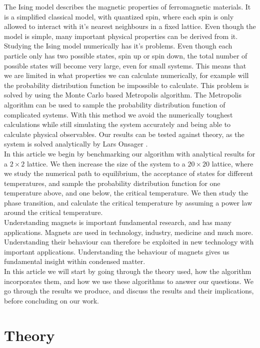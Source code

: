 \documentclass[%
 reprint,
nofootinbib,
aps,
]{revtex4-1}
\begin{document}
The Ising model describes the magnetic properties of ferromagnetic materials. It is a simplified classical model, with quantized spin, where each spin is only allowed to interact with it's nearest neighbours in a fixed lattice. Even though the model is simple, many important physical properties can be derived from it. Studying the Ising model numerically has it's problems. Even though each particle only has two possible states, spin up or spin down, the total number of possible states will become very large, even for small systems. This means that we are limited in what properties we can calculate numerically, for example will the probability distribution function be impossible to calculate. This problem is solved by using the Monte Carlo based Metropolis algorithm. The Metropolis algorithm can be used to sample the probability distribution function of complicated systems. With this method we avoid the numerically toughest calculations while still simulating the system accurately and being able to calculate physical observables. Our results can be tested against theory, as the system is solved analytically by Lars Onsager \cite{onsager}.\\
In this article we begin by benchmarking our algorithm with analytical results for a $2\times 2$ lattice. We then increase the size of the system to a $20\times 20$ lattice, where we study the numerical path to equilibrium, the acceptance of states for different temperatures, and sample the probability distribution function for one temperature above, and one below, the  critical temperature. We then study the phase transition, and calculate the critical temperature by assuming a power law around the critical temperature.
\\
Understanding magnets is important fundamental research, and has many applications. Magnets are used in technology, industry, medicine and much more. Understanding their behaviour can therefore be exploited in new technology with important applications. Understanding the behaviour of magnets gives us fundamental insight within condensed matter.
\\
In this article we will start by going through the theory used, how the algorithm incorporates them, and how we use these algorithms to answer our questions. We go through the results we produce, and discuss the results and their implications, before concluding on our work.

\section{Theory}
\end{document}
